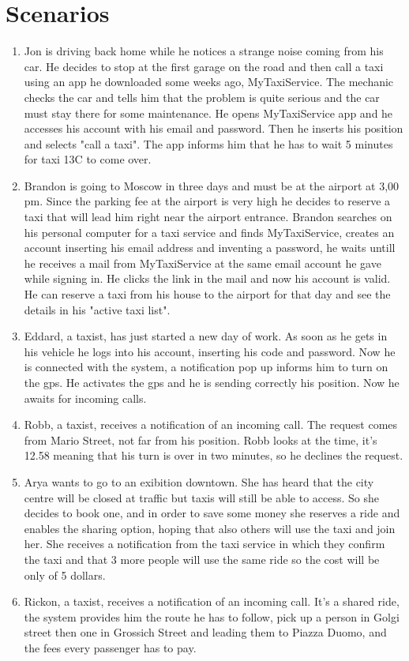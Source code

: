 \section {Scenarios}
\begin{enumerate}
\item
Jon is driving back home while he notices a strange noise coming from his car. He decides to stop at the first garage
on the road and then call a taxi using an app he downloaded some weeks ago, MyTaxiService.
The mechanic checks the car and tells him that the problem is quite serious and the car must stay there for some maintenance. 
He opens MyTaxiService app and he accesses his account with his email and password. Then he inserts his position and selects "call a taxi".
The app informs him that he has to wait 5 minutes for taxi 13C to come over.
\item
Brandon is going to Moscow in three days and must be at the airport at 3,00 pm. Since the parking fee at the airport is very high
he decides to reserve a taxi that will lead him right near the airport entrance.
Brandon searches on his personal computer for a taxi service and finds MyTaxiService, creates an account inserting his email address and 
inventing a password,
he waits untill he receives a mail from MyTaxiService at the same email account he gave while signing in. He clicks the link in the mail
and now his account is valid. He can reserve a taxi from his house to the airport for that day and see the details in his "active taxi list".
\item
Eddard, a taxist, has just started a new day of work.
As soon as he gets in his vehicle he logs into his account, inserting his code and password.
Now he is connected with the system, a notification pop up informs him to turn on the gps. He activates the gps and he is sending correctly his position. 
Now he awaits for incoming calls.
\item
Robb, a taxist, receives a notification of an incoming call. The request comes from Mario Street, not far from his position.
Robb looks at the time, it's 12.58 meaning that his turn is over in two minutes, so he declines the request.
\item
Arya wants to go to an exibition downtown.
She has heard that the city centre will be closed at traffic but taxis will still be able to access. 
So she decides to book one, and in order to save some money she reserves a ride and enables the sharing option,
hoping that also others will use the taxi and join her.
She receives a notification from the taxi service in which they confirm the taxi and that 3 more people will use the same ride so the cost will be only of 5 dollars.
\item
Rickon, a taxist, receives a notification of an incoming call. It's a shared ride, the system provides him the route he has to follow, pick up a person in Golgi street then 
one in Grossich Street and leading them to Piazza Duomo, and the fees every passenger has to pay.
\end{enumerate}

